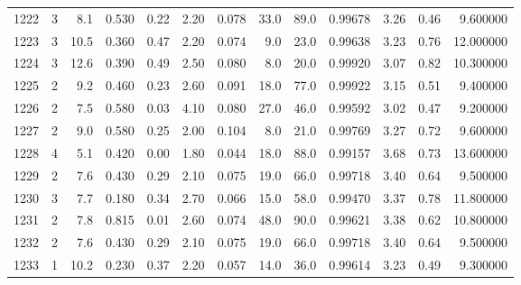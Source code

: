 \begin{tabular}{lrrrrrrrrrrrr}
1222 &        3 &            8.1 &             0.530 &         0.22 &            2.20 &      0.078 &                 33.0 &                  89.0 &  0.99678 &  3.26 &       0.46 &   9.600000 \\
1223 &        3 &           10.5 &             0.360 &         0.47 &            2.20 &      0.074 &                  9.0 &                  23.0 &  0.99638 &  3.23 &       0.76 &  12.000000 \\
1224 &        3 &           12.6 &             0.390 &         0.49 &            2.50 &      0.080 &                  8.0 &                  20.0 &  0.99920 &  3.07 &       0.82 &  10.300000 \\
1225 &        2 &            9.2 &             0.460 &         0.23 &            2.60 &      0.091 &                 18.0 &                  77.0 &  0.99922 &  3.15 &       0.51 &   9.400000 \\
1226 &        2 &            7.5 &             0.580 &         0.03 &            4.10 &      0.080 &                 27.0 &                  46.0 &  0.99592 &  3.02 &       0.47 &   9.200000 \\
1227 &        2 &            9.0 &             0.580 &         0.25 &            2.00 &      0.104 &                  8.0 &                  21.0 &  0.99769 &  3.27 &       0.72 &   9.600000 \\
1228 &        4 &            5.1 &             0.420 &         0.00 &            1.80 &      0.044 &                 18.0 &                  88.0 &  0.99157 &  3.68 &       0.73 &  13.600000 \\
1229 &        2 &            7.6 &             0.430 &         0.29 &            2.10 &      0.075 &                 19.0 &                  66.0 &  0.99718 &  3.40 &       0.64 &   9.500000 \\
1230 &        3 &            7.7 &             0.180 &         0.34 &            2.70 &      0.066 &                 15.0 &                  58.0 &  0.99470 &  3.37 &       0.78 &  11.800000 \\
1231 &        2 &            7.8 &             0.815 &         0.01 &            2.60 &      0.074 &                 48.0 &                  90.0 &  0.99621 &  3.38 &       0.62 &  10.800000 \\
1232 &        2 &            7.6 &             0.430 &         0.29 &            2.10 &      0.075 &                 19.0 &                  66.0 &  0.99718 &  3.40 &       0.64 &   9.500000 \\
1233 &        1 &           10.2 &             0.230 &         0.37 &            2.20 &      0.057 &                 14.0 &                  36.0 &  0.99614 &  3.23 &       0.49 &   9.300000 \\

\end{tabular}
